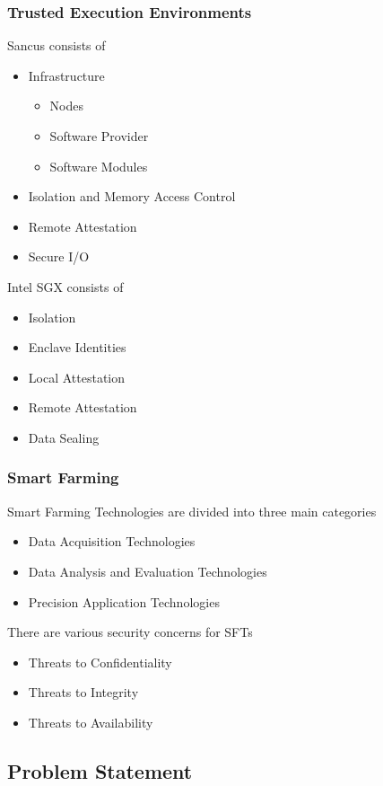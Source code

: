 \documentclass{article}
\begin{document}
\subsubsection{Trusted Execution Environments}

Sancus consists of \begin{itemize}
\item Infrastructure \begin{itemize}
\item Nodes
\item Software Provider
\item Software Modules
\end{itemize}
\item Isolation and Memory Access Control
\item Remote Attestation
\item Secure I/O
\end{itemize}

Intel SGX consists of \begin{itemize}
\item Isolation
\item Enclave Identities
\item Local Attestation
\item Remote Attestation
\item Data Sealing
\end{itemize}

\subsubsection{Smart Farming}

Smart Farming Technologies are divided into three main categories \begin{itemize}
\item Data Acquisition Technologies
\item Data Analysis and Evaluation Technologies
\item Precision Application Technologies
\end{itemize}

There are various security concerns for SFTs \begin{itemize}
\item Threats to Confidentiality
\item Threats to Integrity
\item Threats to Availability
\end{itemize}

\subsection{Problem Statement}
\end{document}
